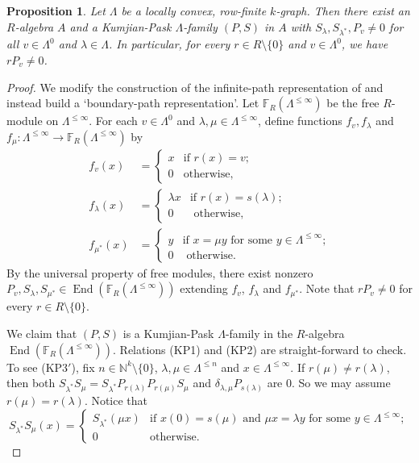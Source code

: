 \documentclass[a4paper,12pt]{amsart}
\numberwithin{equation}{section}
\newtheorem{prop}[thm]{Proposition}
\theoremstyle{definition}
\theoremstyle{remark}
\begin{document}
\begin{prop}
 \label{prop:nonzerofam}
Let $\Lambda$ be a locally convex, row-finite $k$-graph.  Then there exist an $R$-algebra $A$ and a
Kumjian-Pask $\Lambda$-family $(P,S)$ in  $A$ with  $S_{\lambda}, S_{\lambda^*}, P_v  \neq 0$ for all $v\in \Lambda^0$ and $\lambda\in\Lambda$.  In particular, for every 
$r \in R\setminus\{0\}$ and $v\in\Lambda^0$, we have $rP_v \neq 0$.
\end{prop}

\begin{proof}
We modify the construction of the infinite-path representation of \cite{ACaHR} and instead
build a `boundary-path representation'.   Let ${\mathbb{F}}_R(\Lambda^{\leq \infty})$ be the free $R$-module
on $\Lambda^{\leq \infty}$.
For each $v \in \Lambda^0$ and $\lambda, \mu \in \Lambda^{\leq \infty}$,
define functions $f_v,f_{\lambda}$ and $f_{\mu}:\Lambda^{\leq \infty} \to {\mathbb{F}}_R(\Lambda^{\leq \infty})$ by
\begin{align*} f_v(x)&=
     \begin{cases}
      x & \text{if $r(x)=v$;}\\
      0 & \text{otherwise,}
     \end{cases}\\
f_\lambda(x)&=
     \begin{cases}
      \lambda x & \text{if $r(x)=s(\lambda)$;}\\
      0 & \text{ otherwise,}
     \end{cases}\\
f_{\mu^{*}}(x)&=
     \begin{cases}
      y & \text{if $x=\mu y$ for some $y\in\Lambda^{\leq \infty}$;}\\
      0 & \text{ otherwise.}
     \end{cases}
\end{align*}
By the universal property of free modules, there exist nonzero  
$P_v, S_{\lambda}, S_{\mu^{*}} \in \operatorname{End}({\mathbb{F}}_R(\Lambda^{\leq \infty}))$ 
extending $f_v$, $f_{\lambda}$ and $f_{\mu^{*}}$. Note that $rP_v \neq 0$ for every $r \in R\setminus\{0\}$.
 

We claim that $(P,S)$ is a Kumjian-Pask $\Lambda$-family in
the $R$-algebra 
$\operatorname{End}({\mathbb{F}}_R(\Lambda^{\leq \infty}))$.  Relations (KP1) and (KP2) are
straight-forward to check.  To see (KP3$'$), fix $n \in {\mathbb{N}}^k\setminus \{0\}$,
$\lambda, \mu \in \Lambda^{\leq n}$ and $x \in \Lambda^{\leq \infty}$. If $r(\mu)\neq r(\lambda)$, then both
 $S_{\lambda^*}S_{\mu}=S_{\lambda^*}P_{r(\lambda)}P_{r(\mu)}S_{\mu}$ and $\delta_{\lambda,\mu} P_{s(\lambda)}$ are $0$. So we may assume $r(\mu)=r(\lambda)$.
Notice that
\begin{equation*}
 S_{\lambda^*}S_{\mu}(x) 
= \begin{cases}
     S_{\lambda^*}(\mu x) & \text{if } x(0)=s(\mu) \text{ and $\mu x=\lambda y$ for some $y\in\Lambda^{\leq\infty}$}
;\\
0&\text{otherwise}.
   \end{cases}
\end{equation*}


\end{proof}
\end{document}
